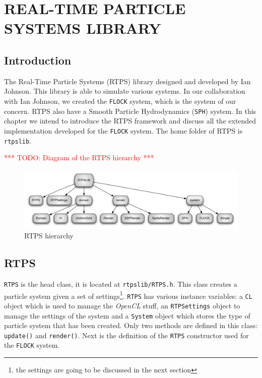 \chapter{REAL-TIME PARTICLE SYSTEMS LIBRARY}

\section{Introduction}
The Real-Time Particle Systems (RTPS) library designed and developed by Ian Johnson\cite{ianPaper}. This library is able to simulate various systems. In our collaboration with Ian Johnson, we created the \texttt{FLOCK} system, which is the system of our concern. RTPS also have a Smooth Particle Hydrodynamics (\texttt{SPH}) system. In this chapter we intend to introduce the RTPS framework and discuss all the extended implementation developed for the \texttt{FLOCK} system. The home folder of RTPS is \texttt{rtpslib}.

\textcolor{red}{*** TODO: Diagram of the RTPS hierarchy ***}
\begin{figure}[htbp]
\begin{center}
\includegraphics[scale=0.5]{figures/RTPSdiagram.pdf}
\caption{RTPS hierarchy}
\label{RTPSdiagram}
\end{center}
\end{figure}



\section{RTPS}
\texttt{RTPS} is the head class, it is located at \texttt{rtpslib/RTPS.h}. This class creates a particle system given a set of settings\footnote{the settings are going to be discussed in the next section}. \texttt{RTPS} has various instance variables: a \texttt{CL} object which is used to manage the \textit{OpenCL} stuff,  an \texttt{RTPSettings} object to manage the settings of the system and a \texttt{System} object which stores the type of particle system that has been created. Only two methods are defined in this class: \texttt{update()} and \texttt{render()}. Next is the definition of the \texttt{RTPS} constructor used for the \texttt{FLOCK} system.

